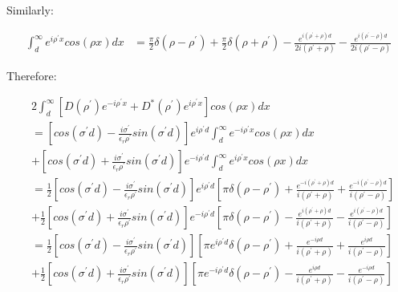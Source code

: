\documentclass[11pt, oneside]{article}   	%
\begin{document}
Similarly:

\begin{align*}
\int_{d}^{\infty}e^{i\rho^{\prime}x}cos\left(\rho x\right)dx & =\frac{\pi}{2}\delta\left(\rho-\rho^{\prime}\right)+\frac{\pi}{2}\delta\left(\rho+\rho^{\prime}\right)-\frac{e^{i\left(\rho^{\prime}+\rho\right)d}}{2i\left(\rho^{\prime}+\rho\right)}-\frac{e^{i\left(\rho^{\prime}-\rho\right)d}}{2i\left(\rho^{\prime}-\rho\right)}
\end{align*}


Therefore: 

\begin{align*}
 & 2\int_{d}^{\infty}\left[D\left(\rho^{\prime}\right)e^{-i\rho^{\prime}x}+D^{*}\left(\rho^{\prime}\right)e^{i\rho^{\prime}x}\right]cos\left(\rho x\right)dx\\
 & =\left[cos\left(\sigma^{\prime}d\right)-\frac{i\sigma^{\prime}}{\epsilon_{r}\rho^{\prime}}sin\left(\sigma^{\prime}d\right)\right]e^{i\rho^{\prime}d}\int_{d}^{\infty}e^{-i\rho^{\prime}x}cos\left(\rho x\right)dx\\
 & +\left[cos\left(\sigma^{\prime}d\right)+\frac{i\sigma^{\prime}}{\epsilon_{r}\rho^{\prime}}sin\left(\sigma^{\prime}d\right)\right]e^{-i\rho^{\prime}d}\int_{d}^{\infty}e^{i\rho^{\prime}x}cos\left(\rho x\right)dx\\
 & =\frac{1}{2}\left[cos\left(\sigma^{\prime}d\right)-\frac{i\sigma^{\prime}}{\epsilon_{r}\rho^{\prime}}sin\left(\sigma^{\prime}d\right)\right]e^{i\rho^{\prime}d}\left[\pi\delta\left(\rho-\rho^{\prime}\right)+\frac{e^{-i\left(\rho^{\prime}+\rho\right)d}}{i\left(\rho^{\prime}+\rho\right)}+\frac{e^{-i\left(\rho^{\prime}-\rho\right)d}}{i\left(\rho^{\prime}-\rho\right)}\right]\\
 & +\frac{1}{2}\left[cos\left(\sigma^{\prime}d\right)+\frac{i\sigma^{\prime}}{\epsilon_{r}\rho^{\prime}}sin\left(\sigma^{\prime}d\right)\right]e^{-i\rho^{\prime}d}\left[\pi\delta\left(\rho-\rho^{\prime}\right)-\frac{e^{i\left(\rho^{\prime}+\rho\right)d}}{i\left(\rho^{\prime}+\rho\right)}-\frac{e^{i\left(\rho^{\prime}-\rho\right)d}}{i\left(\rho^{\prime}-\rho\right)}\right]\\
 & =\frac{1}{2}\left[cos\left(\sigma^{\prime}d\right)-\frac{i\sigma^{\prime}}{\epsilon_{r}\rho^{\prime}}sin\left(\sigma^{\prime}d\right)\right]\left[\pi e^{i\rho^{\prime}d}\delta\left(\rho-\rho^{\prime}\right)+\frac{e^{-i\rho d}}{i\left(\rho^{\prime}+\rho\right)}+\frac{e^{i\rho d}}{i\left(\rho^{\prime}-\rho\right)}\right]\\
 & +\frac{1}{2}\left[cos\left(\sigma^{\prime}d\right)+\frac{i\sigma^{\prime}}{\epsilon_{r}\rho^{\prime}}sin\left(\sigma^{\prime}d\right)\right]\left[\pi e^{-i\rho^{\prime}d}\delta\left(\rho-\rho^{\prime}\right)-\frac{e^{i\rho d}}{i\left(\rho^{\prime}+\rho\right)}-\frac{e^{-i\rho d}}{i\left(\rho^{\prime}-\rho\right)}\right]\\

\end{align*}
\end{document}

